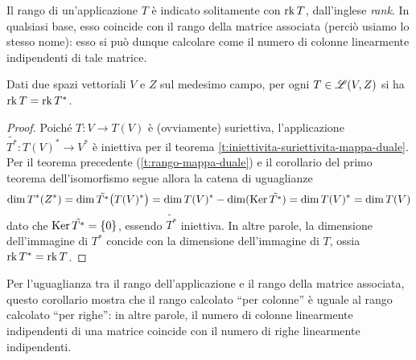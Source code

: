 Il rango di un'applicazione $T$ è indicato solitamente con $\operatorname{rk} T$, dall'inglese \textit{rank}.
In qualsiasi base, esso coincide con il rango della matrice associata (perciò usiamo lo stesso nome): esso si può dunque calcolare come il numero di colonne linearmente indipendenti di tale matrice.
\begin{corollario} \label{c:rango-righe-colonne}
	Dati due spazi vettoriali $V$ e $Z$ sul medesimo campo, per ogni $T\in\mathscr L(V,Z)$ si ha $\operatorname{rk} T=\operatorname{rk} T^*$.
\end{corollario}
\begin{proof}
	Poich\'e $T\colon V\to T(V)$ è (ovviamente) suriettiva, l'applicazione $\tilde{T^*}\colon T(V)^*\to V^*$ è iniettiva per il teorema \ref{t:iniettivita-suriettivita-mappa-duale}.
	Per il teorema precedente (\ref{t:rango-mappa-duale}) e il corollario del primo teorema dell'isomorfismo segue allora la catena di uguaglianze
	\begin{equation}
		\dim T^*(Z^*)=\dim\tilde{T^*}\big(T(V)^*\big)=\dim T(V)^*-\dim(\operatorname{Ker}\tilde{T^*})=\dim T(V)^*=\dim T(V)
	\end{equation}
	dato che $\operatorname{Ker}\tilde{T^*}=\{0\}$, essendo $\tilde{T^*}$ iniettiva.
	In altre parole, la dimensione dell'immagine di $T^*$ concide con la dimensione dell'immagine di $T$, ossia $\operatorname{rk} T^*=\operatorname{rk} T$.
\end{proof}
Per l'uguaglianza tra il rango dell'applicazione e il rango della matrice associata, questo corollario mostra che il rango calcolato ``per colonne'' è uguale al rango calcolato ``per righe'': in altre parole, il numero di colonne linearmente indipendenti di una matrice coincide con il numero di righe linearmente indipendenti.

